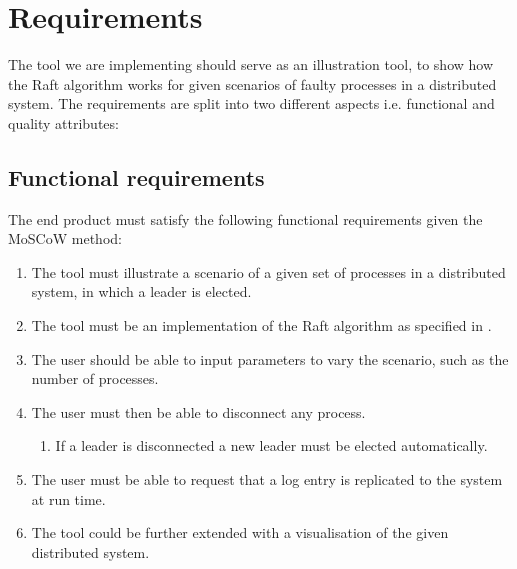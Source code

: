 \section{Requirements} %
\label{sec:requirements}
The tool we are implementing should serve as an illustration tool, to show how the Raft algorithm works for given scenarios of faulty processes in a distributed system.
The requirements are split into two different aspects i.e. functional and quality attributes:
\subsection{Functional requirements}
The end product must satisfy the following functional requirements given the MoSCoW method:
\begin{enumerate}
\item The tool must illustrate a scenario of a given set of processes in a distributed system, in which a leader is elected.
\item The tool must be an implementation of the Raft algorithm as specified in \cite{Raft}.
\item The user should be able to input parameters to vary the scenario, such as the number of processes.
\item The user must then be able to disconnect any process.
	\begin{enumerate}
	\item If a leader is disconnected a new leader must be elected automatically.
	\end{enumerate}
\item The user must be able to request that a log entry is replicated to the system at run time.
\item The tool could be further extended with a visualisation of the given distributed system.
\end{enumerate}
